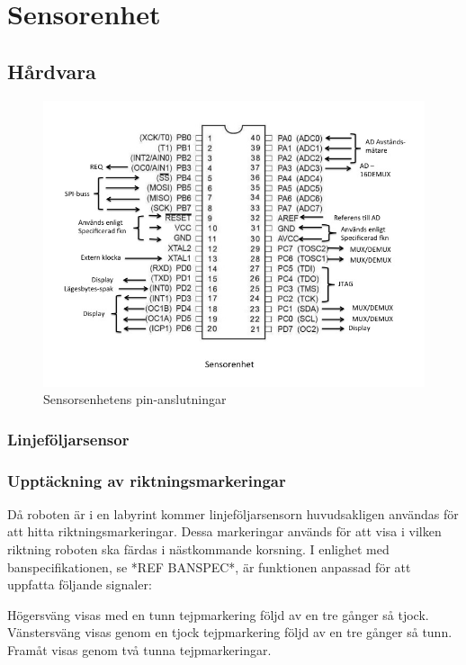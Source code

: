 \section{Sensorenhet}

\subsection{Hårdvara}

\begin{figure}[H]
  \centering
 \includegraphics[angle=0,scale=0.5]{bilder/PIN_sensor.jpg}
  \caption{Sensorsenhetens pin-anslutningar}
  \label{fig:PINsensor}
\end{figure}


\subsubsection{Linjeföljarsensor}

\subsubsection{Upptäckning av riktningsmarkeringar}
\label{riktmark}
Då roboten är i en labyrint kommer linjeföljarsensorn huvudsakligen användas 
för att hitta riktningsmarkeringar. Dessa markeringar används för att visa i 
vilken riktning roboten ska färdas i nästkommande korsning.  I enlighet med 
banspecifikationen, se *REF BANSPEC*, är funktionen anpassad för att uppfatta 
följande signaler:

Högersväng visas med en tunn tejpmarkering följd av en tre gånger så tjock.
Vänstersväng visas genom en tjock tejpmarkering följd av en tre gånger så tunn.
Framåt visas genom två tunna tejpmarkeringar.


